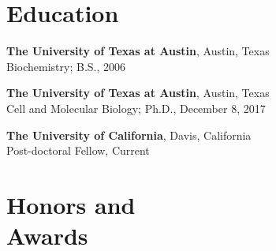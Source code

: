 \documentclass[margin,line]{CV}
\begin{document}
\pagestyle{plain}

\begin{resume}




\section{\mysidestyle Education}

\begin{description}[leftmargin=0pt] 
\setlength{\itemsep}{4pt}
\item[] {\bf The University of Texas at Austin}, Austin, Texas \\Biochemistry; B.S., 2006
\item[] {\bf The University of Texas at Austin}, Austin, Texas \\Cell and Molecular Biology; Ph.D., December 8, 2017
\item[] {\bf The University of California}, Davis, California \\ Post-doctoral Fellow, Current 
\end{description}
    
 \section{\mysidestyle Honors and \\ Awards} 


\end{resume}
\end{document}
